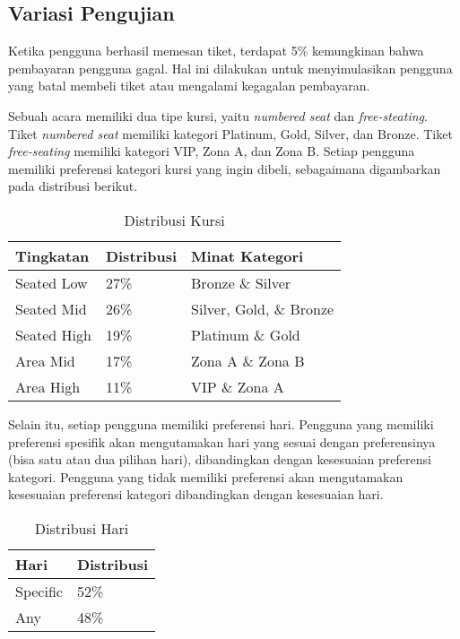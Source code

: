 \subsection{Variasi Pengujian}

Ketika pengguna berhasil memesan tiket, terdapat 5\% kemungkinan bahwa pembayaran pengguna gagal. Hal ini dilakukan untuk menyimulasikan pengguna yang batal membeli tiket atau mengalami kegagalan pembayaran.

Sebuah acara memiliki dua tipe kursi, yaitu \textit{numbered seat} dan \textit{free-steating}. Tiket \textit{numbered seat} memiliki kategori Platinum, Gold, Silver, dan Bronze. Tiket \textit{free-seating} memiliki kategori VIP, Zona A, dan Zona B. Setiap pengguna memiliki preferensi kategori kursi yang ingin dibeli, sebagaimana digambarkan pada distribusi berikut.

\begin{table}[h]
    \centering
    \begin{tabular}{|l|l|l|}
        \hline
        \textbf{Tingkatan} & \textbf{Distribusi} & \textbf{Minat Kategori} \\
        \hline
        Seated Low         & 27\%                & Bronze \& Silver        \\
        \hline
        Seated Mid         & 26\%                & Silver, Gold, \& Bronze \\
        \hline
        Seated High        & 19\%                & Platinum \& Gold        \\
        \hline
        Area Mid           & 17\%                & Zona A \& Zona B        \\
        \hline
        Area High          & 11\%                & VIP \& Zona A           \\
        \hline
    \end{tabular}
    \caption{Distribusi Kursi}
\end{table}

Selain itu, setiap pengguna memiliki preferensi hari. Pengguna yang memiliki preferensi spesifik akan mengutamakan hari yang sesuai dengan preferensinya (bisa satu atau dua pilihan hari), dibandingkan dengan kesesuaian preferensi kategori. Pengguna yang tidak memiliki preferensi akan mengutamakan kesesuaian preferensi kategori dibandingkan dengan kesesuaian hari.

\begin{table}[h]
    \centering
    \begin{tabular}{|l|l|}
        \hline
        \textbf{Hari} & \textbf{Distribusi} \\
        \hline
        Specific      & 52\%                \\
        \hline
        Any           & 48\%                \\
        \hline
    \end{tabular}
    \caption{Distribusi Hari}
\end{table}

